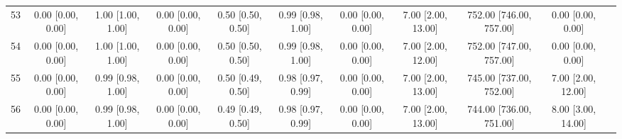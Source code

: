 \documentclass[8pt]{article}
\begin{document}
\begin{center}
\begin{footnotesize}
\begin{longtable}{|ccccccccccc|}
 53 &  0.00 [0.00, 0.00] &  1.00 [1.00, 1.00] &  0.00 [0.00, 0.00] &  0.50 [0.50, 0.50] &  0.99 [0.98, 1.00] &  0.00 [0.00, 0.00] &  7.00 [2.00, 13.00] &  752.00 [746.00, 757.00] &        0.00 [0.00, 0.00] \\
 54 &  0.00 [0.00, 0.00] &  1.00 [1.00, 1.00] &  0.00 [0.00, 0.00] &  0.50 [0.50, 0.50] &  0.99 [0.98, 1.00] &  0.00 [0.00, 0.00] &  7.00 [2.00, 12.00] &  752.00 [747.00, 757.00] &        0.00 [0.00, 0.00] \\
 55 &  0.00 [0.00, 0.00] &  0.99 [0.98, 1.00] &  0.00 [0.00, 0.00] &  0.50 [0.49, 0.50] &  0.98 [0.97, 0.99] &  0.00 [0.00, 0.00] &  7.00 [2.00, 13.00] &  745.00 [737.00, 752.00] &       7.00 [2.00, 12.00] \\
 56 &  0.00 [0.00, 0.00] &  0.99 [0.98, 1.00] &  0.00 [0.00, 0.00] &  0.49 [0.49, 0.50] &  0.98 [0.97, 0.99] &  0.00 [0.00, 0.00] &  7.00 [2.00, 13.00] &  744.00 [736.00, 751.00] &       8.00 [3.00, 14.00] \\
\end{longtable}
\end{footnotesize}
\end{center}
\end{document}
